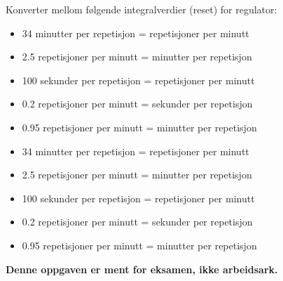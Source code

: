 

Konverter mellom følgende integralverdier (reset) for regulator:

\vskip 10pt

\begin{itemize}
\item{} 34 minutter per repetisjon = \underbar{\hskip 50pt} repetisjoner per minutt
\vskip 5pt
\item{} 2.5 repetisjoner per minutt = \underbar{\hskip 50pt} minutter per repetisjon
\vskip 5pt
\item{} 100 sekunder per repetisjon = \underbar{\hskip 50pt} repetisjoner per minutt
\vskip 5pt
\item{} 0.2 repetisjoner per minutt = \underbar{\hskip 50pt} sekunder per repetisjon
\vskip 5pt
\item{} 0.95 repetisjoner per minutt = \underbar{\hskip 50pt} minutter per repetisjon
\end{itemize}







\begin{itemize}
\item{} 34 minutter per repetisjon =  repetisjoner per minutt
\item{} 2.5 repetisjoner per minutt =  minutter per repetisjon
\item{} 100 sekunder per repetisjon =  repetisjoner per minutt
\item{} 0.2 repetisjoner per minutt =  sekunder per repetisjon
\item{} 0.95 repetisjoner per minutt =  minutter per repetisjon
\end{itemize}







{\bf Denne oppgaven er ment for eksamen, ikke arbeidsark.}

